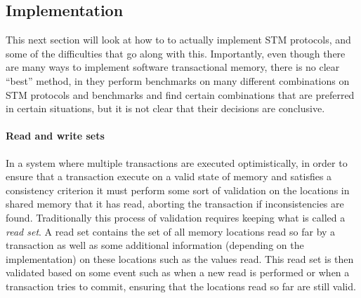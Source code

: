 

\subsection{Implementation}
This next section will look at how to to actually implement STM protocols, and some
 of the difficulties that go along with this.
Importantly, even though there are many ways to implement software transactional memory, there is no clear ``best''
method, in \cite{1123001} they 
perform benchmarks on many different combinations on STM protocols and benchmarks and find certain combinations that are
preferred in certain situations, but it is not clear that their decisions are conclusive.


\paragraph{Read and write sets}
In a system where multiple transactions are executed optimistically,
in order to ensure that a transaction execute on a valid state of memory and satisfies
a consistency criterion it must perform some sort of validation on the locations in shared memory that it has read,
aborting the transaction if inconsistencies are found.
Traditionally this process of validation requires keeping what is called a \emph{read set}.
A read set contains the set of all memory locations read so far by a transaction as well as some additional information
(depending on the implementation) on these locations such as the values read.
This read set is then validated based on some event such as when a new read is performed or when a transaction tries to commit,
 ensuring that the locations read so far are still valid.

